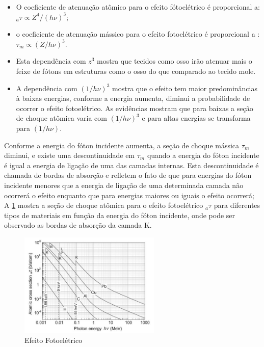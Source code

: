 \documentclass[11pt,a4paper]{article}
\begin{document}
    \begin{itemize}
		\item O coeficiente de atenuação atômico para o efeito fótoelétrico é proporcional a: ${}_a\tau \propto Z^4 / (h\nu)^3$;
		\item o coeficiente de atenuação mássico para o efeito fotoelétrico é proporcional a
		: $\tau_m \propto (Z / h\nu)^3$. 
		\item Esta dependência com $z^3$ mostra que tecidos como osso irão atenuar mais o feixe de fótons em estruturas como o osso do que comparado ao tecido mole. 
		\item A dependência com $(1 / h\nu)^3$ mostra que o efeito tem maior predominâncias à baixas energias, conforme a energia aumenta, diminui a probabilidade de ocorrer o efeito fotoelétrico. As evidências mostram que para baixas a seção de choque atômica varia com $(1 / h\nu)^3$ e para altas energias se transforma para $(1 / h\nu)$. 
	\end{itemize}

    Conforme a energia do fóton incidente aumenta, a seção de choque mássica $\tau_m$ diminui, e existe uma descontinuidade em $\tau_m$ quando a energia do fóton incidente é igual a energia de ligação de uma das camadas internas. Esta descontinuidade é chamada de bordas de absorção e refletem o fato de que para energias do fóton incidente menores que a energia de ligação de uma determinada camada não ocorrerá o efeito enquanto que para energias maiores ou iguais o efeito ocorrerá; A \ref{fig:descontinuidadeEfeitoFotoeletrico} mostra a seção de choque atômica para o efeito fotoelétrico ${}_a\tau$ para diferentes tipos de materiais em função da energia do fóton incidente, onde pode ser observado as bordas de absorção da camada K.

    \begin{figure}[h]
		\centering
		\includegraphics[width=0.6\textwidth]{Imagens/descontinuidadeEfeitoFotoeletrico.JPG}
		\caption{Efeito Fotoelétrico}
		\label{fig:descontinuidadeEfeitoFotoeletrico}
	\end{figure}        
\end{document}
